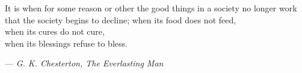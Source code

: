 \begin{titlepage}
\begin{center}
\end{center}

\vspace*{\fill}

\cleardoublepage %

\thispagestyle{empty}
\vspace*{\fill}
\begin{center}
\end{center}
\vspace*{\fill}

\clearpage

\vspace*{5em}
\begin{minipage}{4in}
\begin{center}
It is when for some reason or other the good things in a society no longer work that the society begins to decline;
\baselineskip
when its food does not feed, \\
when its cures do not cure, \\ 
when its blessings refuse to bless. 
\end{center}
\hfill --- \textit{G. K. Chesterton, The Everlasting Man}
\end{minipage}

\clearpage

\end{titlepage}
